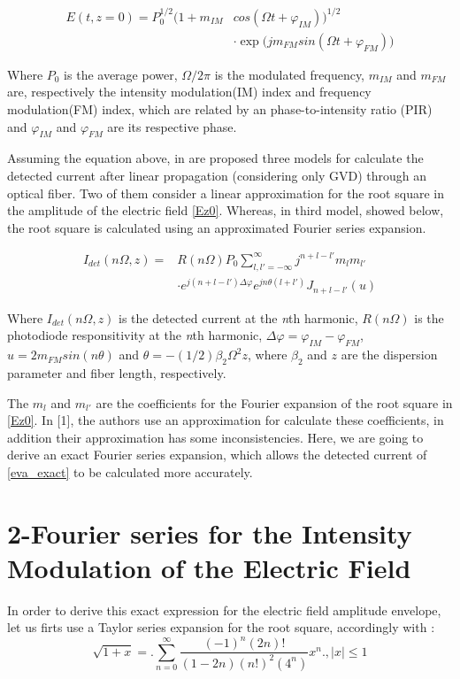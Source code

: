 \documentclass[twocolumn]{el-author}
\begin{document}
\begin{align} \label{Ez0} \nonumber
E(t,z = 0) = P_0^{1/2}\Big(1 + m_{IM}&cos(\Omega t + \varphi_{IM})\Big)^{1/2} \\
&\cdot \exp\Big(jm_{FM}sin(\Omega t + \varphi_{FM})\Big)
\end{align}

Where $P_0$ is the average power, $\Omega/2\pi$ is the modulated frequency, $m_{IM}$ and $m_{FM}$ are, respectively the intensity modulation(IM) index and frequency modulation(FM) index, which are related by an phase-to-intensity ratio (PIR) \cite{eva} and $\varphi_{IM}$ and $\varphi_{FM}$ are its respective phase.

Assuming the equation above, in \cite{eva} are proposed three models for calculate the detected current after linear propagation (considering only GVD) through an optical fiber. Two of them consider a linear approximation for the root square in the amplitude of the electric field \eqref{Ez0}.  Whereas, in third model, showed below, the root square is calculated using an approximated Fourier series expansion.

\begin{align} \label{eva_exact} \nonumber
I_{det}(n\Omega,z) = &R(n\Omega)P_0 \sum_{l, l' = -\infty}^{\infty} j^{n + l - l'}m_lm_{l'} \\
& \cdot e^{j(n + l - l')\Delta\varphi}e^{jn\theta(l + l')}J_{n+l-l'}(u)
\end{align}

Where $I_{det}(n\Omega,z)$ is the detected current at the \emph{n}th harmonic, $R(n\Omega)$ is the photodiode responsitivity at the \emph{n}th harmonic, $\Delta\varphi = \varphi_{IM} - \varphi_{FM}$, $u = 2m_{FM}sin(n\theta)$ and $\theta = -(1/2)\beta_2\Omega^2z$, where $\beta_2$ and $z$ are the dispersion parameter and fiber length, respectively.

The $m_l$ and $m_{l'}$ are the coefficients for the Fourier expansion of the root square in \eqref{Ez0}. In [1], the authors use an approximation for calculate these coefficients, in addition their approximation has some inconsistencies. Here, we are going to derive an exact Fourier series expansion, which allows the detected current of \eqref{eva_exact} to be calculated more accurately.

\mbox{}

\section{2-Fourier series for the Intensity Modulation of the Electric Field}
In order to derive this exact expression for the electric field amplitude envelope, let us firts use a Taylor series expansion for the root square, accordingly with \cite{2}:
\begin{equation} \label{taylor_raiz_quadrada}
\sqrt{1 + x} = \bigg.\sum_{n = 0}^{\infty}\frac{(-1)^n(2n)!}{(1 - 2n)(n!)^2(4^n)}x^n\bigg., |x| \leq 1
\end{equation}
\end{document}
